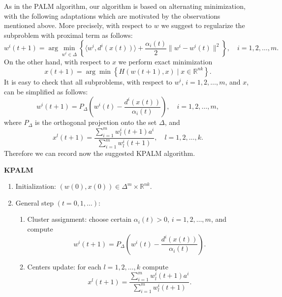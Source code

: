 \documentclass[11pt]{article}
\numberwithin{equation}{section}
\begin{document}
As in the PALM algorithm, our algorithm is based on alternating minimization, with the following adaptations which are motivated by the observations mentioned above. More precisely, with respect to $w$ we suggest to regularize the subproblem with proximal term as follows:
\begin{equation}
	w^i(t+1) = \arg\!\min\limits_{w^i \in \Delta} \left\lbrace \langle w^i , d^i(x(t)) \rangle + \frac{\alpha_i(t)}{2} \|w^i - w^i(t)\|^2 \right\rbrace, \quad i=1,2, \ldots, m . \label{State_w_update}
\end{equation}
On the other hand, with respect to $x$ we perform exact minimization
\begin{equation}
	x(t+1) = \arg\!\min \left\lbrace H(w(t+1), x) \mid x \in \mathbb{R}^{nk} \right\rbrace . \label{State_x_update}
\end{equation}
It is easy to check that all subproblems, with respect to $w^i$, $i=1,2, \ldots, m$, and $x$, can be simplified as follows:
\begin{equation}
w^i(t+1) = P_{\Delta} \left(w^i(t) - \frac{d^i(x(t))}{\alpha_i(t)}\right) , \quad i=1, 2, \ldots ,m , \label{StateEq7}
\end{equation}
where $P_{\Delta}$ is the orthogonal projection onto the set $\Delta$, and
\begin{equation}
x^l(t+1) = \frac{\sum_{i=1}^{m} w^i_l(t+1) a^i}{\sum_{i=1}^{m} w^i_l(t+1)} , \quad l=1, 2, \ldots ,k . \label{StateEq8}
\end{equation}
\newpage
Therefore we can record now the suggested KPALM algorithm.
\begin{framed}
\noindent \textbf{KPALM}
\begin{enumerate}[(1)]
	\item Initialization: $(w(0),x(0)) \in \Delta^m \times \mathbb{R}^{nk} .$
	\item General step $\left( t=0,1, \ldots \right)$:
	\begin{enumerate}[(2.1)]
		\item Cluster assignment: choose certain $\alpha_i(t) > 0$, $i=1,2, \ldots, m$, and compute
		\begin{equation}
			w^i(t+1) = P_{\Delta} \left(w^i(t) - \frac{d^i(x(t))}{\alpha_i(t)}\right) . \label{StateEq5}
		\end{equation}
		\item Centers update: for each $l=1, 2, \ldots ,k$ compute
		\begin{equation}
			x^l(t+1) = \frac{\sum_{i=1}^{m} w^i_l(t+1) a^i}{\sum_{i=1}^{m} w^i_l(t+1)} . \label{StateEq6}
		\end{equation}
	\end{enumerate}
\end{enumerate}
\end{framed}
\end{document}
